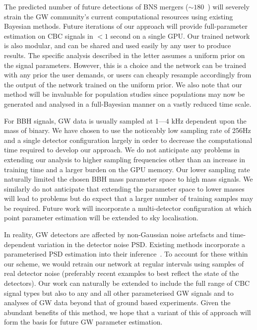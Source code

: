 \documentclass[%
showpacs,
 amsmath,amssymb,
 aps,
 twocolumn,
 prl,
 reprint,
floatfix,
]{revtex4-1}
\begin{document}
%
%
The predicted number of future detections of \ac{BNS} mergers ($\sim
180$~\cite{2018LRR....21....3A}) will severely strain the \ac{GW} community's
current computational resources using existing Bayesian methods. Future
iterations of our approach will provide full-parameter estimation on \ac{CBC}
signals in $<1$ second on a single \ac{GPU}. Our trained network is also
modular, and can be shared and used easily by any user to produce results. The
specific analysis described in the letter assumes a uniform prior on the signal
parameters. However, this is a choice and the network can be trained with any
prior the user demands, or users can cheaply resample accordingly from the
output of the network trained on the uniform prior. We also note that our
method will be invaluable for population studies since populations may now be
generated and analysed in a full-Bayesian manner on a vastly reduced time
scale. 

%
%
For \ac{BBH} signals, \ac{GW} data is usually sampled at $1$---$4$ kHz
dependent upon the mass of binary. We have chosen to use the noticeably low
sampling rate of 256Hz and a single detector configuration largely in order to
decrease the computational time required to develop our approach. We do not
anticipate any problems in extending our analysis to higher sampling
frequencies other than an increase in training time and a larger burden on the
\ac{GPU} memory. Our lower sampling rate naturally limited the chosen \ac{BBH}
mass parameter space to high mass signals. We similarly do not anticipate that
extending the parameter space to lower masses will lead to problems but do
expect that a larger number of training samples may be required. Future work
will incorporate a multi-detector configuration at which point parameter
estimation will be extended to sky localisation. 

%
%
In reality, \ac{GW} detectors are affected by non-Gaussian noise artefacts and
time-dependent variation in the detector noise \ac{PSD}. Existing methods
incorporate a parameterised \ac{PSD} estimation into their
inference~\cite{2015PhRvD..91h4034L}. To account for these within our scheme,
we would retrain our network at regular intervals using samples of real
detector noise (preferably recent examples to best reflect the state of the
detectors). Our work can naturally be extended to include the full range of
\ac{CBC} signal types but also to any and all other parameterised \ac{GW}
signals and to analyses of \ac{GW} data beyond that of ground based
experiments. Given the abundant benefits of this method, we hope that a variant
of this of approach will form the basis for future \ac{GW} parameter
estimation.
%
%
\end{document}
